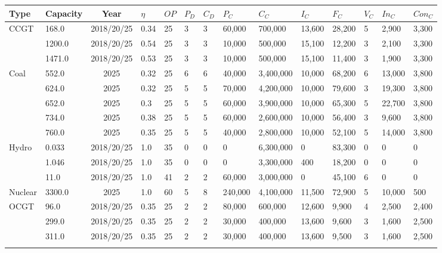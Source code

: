 \begin{table*}[]
	\begin{tabularx}{1.0205\linewidth}{|l|l|c|l|l|l|l|l|l|l|l|l|l|l|}
	\hline
	Type & Capacity & Year & $\eta$ & $OP$ & $P_D$ & $C_D$ & $P_C$ & $C_C$ & $I_C$ & $F_C$ & $V_C$ & $In_C$ & $Con_C$ \\ \hline
	\multirow{3}{*}{CCGT} & 168.0 & 2018/20/25 & 0.34 & 25 & 3 & 3 & 60,000 & 700,000 & 13,600 & 28,200 & 5 & 2,900 & 3,300 \\ \cline{2-14} 
	& 1200.0 & 2018/20/25 & 0.54 & 25 & 3 & 3 & 10,000 & 500,000 & 15,100 & 12,200 & 3 & 2,100 & 3,300 \\ \cline{2-14} 
	& 1471.0 & 2018/20/25 & 0.53 & 25 & 3 & 3 & 10,000 & 500,000 & 15,100 & 11,400 & 3 & 1,900 & 3,300 \\ \hline
	\multirow{5}{*}{Coal} & 552.0 & 2025 & 0.32 & 25 & 6 & 6 & 40,000 & 3,400,000 & 10,000 & 68,200 & 6 & 13,000 & 3,800 \\ \cline{2-14} 
	& 624.0 & 2025 & 0.32 & 25 & 5 & 5 & 70,000 & 4,200,000 & 10,000 & 79,600 & 3 & 19,300 & 3,800 \\ \cline{2-14} 
	& 652.0 & 2025 & 0.3 & 25 & 5 & 5 & 60,000 & 3,900,000 & 10,000 & 65,300 & 5 & 22,700 & 3,800 \\ \cline{2-14} 
	& 734.0 & 2025 & 0.38 & 25 & 5 & 5 & 60,000 & 2,600,000 & 10,000 & 56,400 & 3 & 9,600 & 3,800 \\ \cline{2-14} 
	& 760.0 & 2025 & 0.35 & 25 & 5 & 5 & 40,000 & 2,800,000 & 10,000 & 52,100 & 5 & 14,000 & 3,800 \\ \hline
	\multirow{3}{*}{Hydro} & 0.033 & 2018/20/25 & 1.0 & 35 & 0 & 0 & 0 & 6,300,000 & 0 & 83,300 & 0 & 0 & 0 \\ \cline{2-14} 
	& 1.046 & 2018/20/25 & 1.0 & 35 & 0 & 0 & 0 & 3,300,000 & 400 & 18,200 & 0 & 0 & 0 \\ \cline{2-14} 
	& 11.0 & 2018/20/25 & 1.0 & 41 & 2 & 2 & 60,000 & 3,000,000 & 0 & 45,100 & 6 & 0 & 0 \\ \hline
	Nuclear & 3300.0 & 2025 & 1.0 & 60 & 5 & 8 & 240,000 & 4,100,000 & 11,500 & 72,900 & 5 & 10,000 & 500 \\ \hline
	\multirow{5}{*}{OCGT} & 96.0 & 2018/20/25 & 0.35 & 25 & 2 & 2 & 80,000 & 600,000 & 12,600 & 9,900 & 4 & 2,500 & 2,400 \\ \cline{2-14} 
	& 299.0 & 2018/20/25 & 0.35 & 25 & 2 & 2 & 30,000 & 400,000 & 13,600 & 9,600 & 3 & 1,600 & 2,500 \\ \cline{2-14} 
	& 311.0 & 2018/20/25 & 0.35 & 25 & 2 & 2 & 30,000 & 400,000 & 13,600 & 9,500 & 3 & 1,600 & 2,500 \\ \cline{2-14} 

\end{tabularx}
\end{table*}
